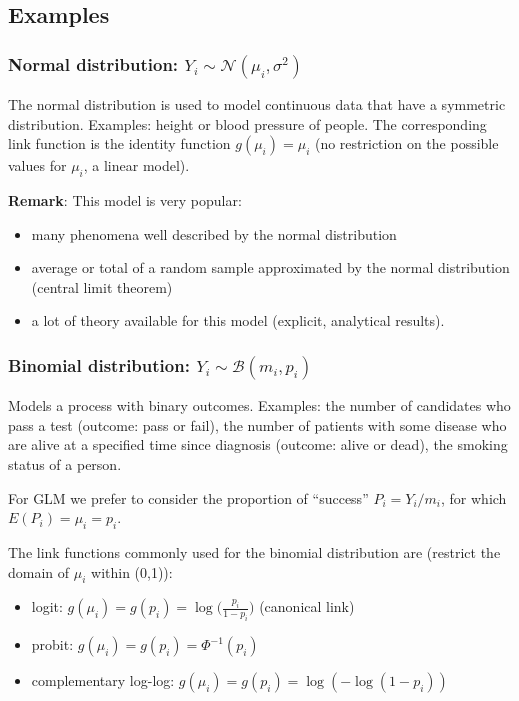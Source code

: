 \documentclass{beamer}
\newcommand{\bs}{\bigskip}
\newcommand{\sms}{\smallskip}
\begin{document}
\subsection{Examples}

\begin{frame}
\frametitle{Normal distribution: $Y_i \sim {\mathcal N}(\mu_i,\sigma^2)$}


The normal distribution is used to model continuous data that have a symmetric
distribution. Examples: height or blood pressure of people. The corresponding
link function is the identity function $g(\mu_i)=\mu_i$ (no restriction on the
possible values for $\mu_i$, a linear model).

\bs
\bs

\textbf{Remark}: This model is very popular:
\begin{itemize}
\item many phenomena well described by the normal distribution
\item average or total of a random sample approximated by the normal distribution (central limit theorem)
\item a lot of theory available for this model (explicit, analytical results).
\end{itemize}
\end{frame}

\begin{frame}
\frametitle{Binomial distribution: $Y_i \sim {\mathcal B}(m_i,p_i)$}

Models a process with binary outcomes. Examples: the number of candidates who
pass a test (outcome: pass or fail), the number of patients with some disease
who are alive at a specified time since diagnosis (outcome: alive or dead), the
smoking status of a person.

\bs

For GLM we prefer to consider the proportion of ``success'' $P_i = Y_i/m_i$, for
which $E(P_i) = \mu_i = p_i$.

\sms
The link functions commonly used for the binomial distribution are (restrict the
domain of $\mu_i$ within (0,1)):
\begin{itemize}
\item {\color{blue} logit}: $g(\mu_i) = g(p_i) =
\log\big(\frac{p_i}{1-p_i}\big)$ (canonical link)
\item {\color{blue} probit}: $g(\mu_i) = g(p_i) = \Phi^{-1}(p_i)$
\item {\color{blue} complementary log-log}: $g(\mu_i) = g(p_i) = \log(-\log(1-p_i))$
\end{itemize}
\end{frame}
\end{document}
